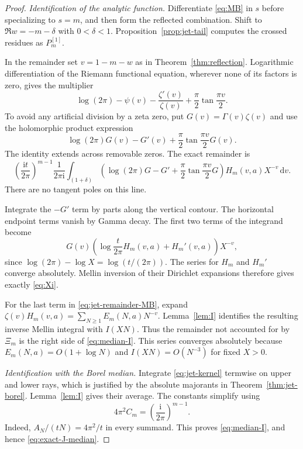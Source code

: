 \documentclass[11pt,a4paper]{article}
\numberwithin{equation}{section}
\theoremstyle{definition}\newtheorem{definition}[theorem]{Definition}
\theoremstyle{remark}\newtheorem{remark}[theorem]{Remark}
\newcommand{\ii}{\mathrm i}\newcommand{\e}{\mathrm e}
\newcommand{\dd}{\,\mathrm d}\newcommand{\Li}{\operatorname{Li}}
\begin{document}
\begin{proof}
\emph{Identification of the analytic function.}
Differentiate \eqref{eq:MB} in $s$ before specializing to $s=m$, and
then form the reflected combination. Shift to
$\Re w=-m-\delta$ with $0<\delta<1$. Proposition~\ref{prop:jet-tail}
computes the crossed residues as $P_m^{[1]}$.

In the remainder set $v=1-m-w$ as in
Theorem~\ref{thm:reflection}. Logarithmic differentiation of the
Riemann functional equation, wherever none of its factors is zero,
gives the multiplier
\[
 \log(2\pi)-\psi(v)-\frac{\zeta'(v)}{\zeta(v)}
                                +\frac\pi2\tan\frac{\pi v}{2}.
\]
To avoid any artificial division by a zeta zero, put
$G(v)=\Gamma(v)\zeta(v)$ and use the holomorphic product expression
\begin{equation}
 \log(2\pi)G(v)-G'(v)+\frac\pi2\tan\frac{\pi v}{2}G(v).
 \label{eq:FE-jet-product}
\end{equation}
The identity extends across removable zeros. The exact remainder is
\begin{equation}
 \left(\frac{\ii t}{2\pi}\right)^{m-1}
 \frac1{2\pi\ii}\int_{(1+\delta)}
 \left(\log(2\pi)G-G'+\frac\pi2\tan\frac{\pi v}2G\right)
                         H_m(v,a)X^{-v}\dd v.
 \label{eq:jet-remainder-MB}
\end{equation}
There are no tangent poles on this line.

Integrate the $-G'$ term by parts along the vertical contour. The
horizontal endpoint terms vanish by Gamma decay. The first two terms
of the integrand become
\[
 G(v)\left(\log\frac{t}{2\pi}H_m(v,a)+H_m'(v,a)\right)X^{-v},
\]
since $\log(2\pi)-\log X=\log(t/(2\pi))$.
The series for $H_m$ and $H_m'$ converge absolutely. Mellin inversion
of their Dirichlet expansions therefore gives exactly \eqref{eq:Xi}.

For the last term in \eqref{eq:jet-remainder-MB}, expand
$\zeta(v)H_m(v,a)=\sum_{N\ge1}E_m(N,a)N^{-v}$.
Lemma~\ref{lem:I} identifies the resulting inverse Mellin integral with
$I(XN)$. Thus the remainder not accounted for by $\Xi_m$ is the
right side of \eqref{eq:median-I}.
This series converges absolutely because
$E_m(N,a)=O(1+\log N)$ and $I(XN)=O(N^{-3})$ for fixed $X>0$.

\emph{Identification with the Borel median.}
Integrate \eqref{eq:jet-kernel} termwise on upper and lower rays,
which is justified by the absolute majorants in
Theorem~\ref{thm:jet-borel}. Lemma~\ref{lem:I} gives their average.
The constants simplify using
\begin{equation}
 4\pi^2 C_m=\left(\frac{\ii}{2\pi}\right)^{m-1}.
 \label{eq:constant-check}
\end{equation}
Indeed, $A_N/(tN)=4\pi^2/t$ in every summand. This proves
\eqref{eq:median-I}, and hence \eqref{eq:exact-J-median}.


\end{proof}
\end{document}

